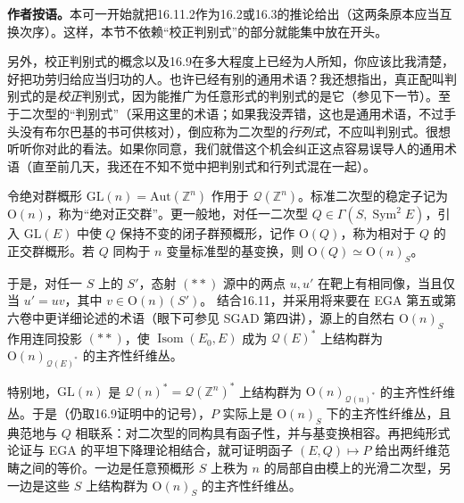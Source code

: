 \begingroup
\def\newscope{V-Q}
\def\OO{\mathcal O}
\def\Qsp{\mathcal Q}
\def\Sym{\operatorname{Sym}}
\def\Isom{\operatorname{Isom}}
\def\Spec{\operatorname{Spec}}
\noindent\textbf{作者按语。}\quad 本可一开始就把16.11.2作为16.2或16.3的推论给出（这两条原本应当互换次序）。这样，本节不依赖“校正判别式”的部分就能集中放在开头。

另外，校正判别式的概念以及16.9在多大程度上已经为人所知，你应该比我清楚，好把功劳归给应当归功的人。也许已经有别的通用术语？我还想指出，真正配叫判别式的是\emph{校正}判别式，因为能推广为任意形式的判别式的是它（参见下一节）。至于二次型的“判别式”（采用这里的术语；如果我没弄错，这也是通用术语，不过手头没有布尔巴基的书可供核对），倒应称为二次型的\emph{行列式}，不应叫判别式。很想听听你对此的看法。如果你同意，我们就借这个机会纠正这点容易误导人的通用术语（直至前几天，我还在不知不觉中把判别式和行列式混在一起）。

令绝对群概形 $\mathrm{GL}(n)=\mathrm{Aut}(\mathbb Z^n)$ 作用于 $\Qsp(\mathbb Z^n)$。标准二次型的稳定子记为 $\mathrm O(n)$，称为“绝对正交群”。更一般地，对任一二次型 $Q\in\Gamma(S,\Sym^2E)$，引入 $\mathrm{GL}(E)$ 中使 $Q$ 保持不变的闭子群预概形，记作 $\mathrm O(Q)$，称为相对于 $Q$ 的正交群概形。若 $Q$ 同构于 $n$ 变量标准型的基变换，则 $\mathrm O(Q)\simeq\mathrm O(n)_S$。

于是，对任一 $S$ 上的 $S'$，态射 $(**)$ 源中的两点 $u,u'$ 在靶上有相同像，当且仅当 $u'=uv$，其中 $v\in\mathrm O(n)(S')$。
结合16.11，并采用将来要在 EGA 第五或第六卷中更详细论述的术语（眼下可参见 SGAD 第四讲），源上的自然右 $\mathrm O(n)_S$ 作用连同投影 $(**)$，使 $\Isom(E_0,E)$ 成为 $\Qsp(E)^*$ 上结构群为 $\mathrm O(n)_{\Qsp(E)^*}$ 的主齐性纤维丛。

特别地，$\mathrm{GL}(n)$ 是 $\Qsp(n)^*=\Qsp(\mathbb Z^n)^*$ 上结构群为 $\mathrm O(n)_{\Qsp(n)^*}$ 的主齐性纤维丛。于是（仍取16.9证明中的记号），$P$ 实际上是 $\mathrm O(n)_S$ 下的主齐性纤维丛，且典范地与 $Q$ 相联系：对二次型的同构具有函子性，并与基变换相容。再把纯形式论证与 EGA 的平坦下降理论相结合，就可证明函子 $(E,Q)\mapsto P$ 给出两纤维范畴之间的等价。一边是任意预概形 $S$ 上秩为 $n$ 的局部自由模上的光滑二次型，另一边是这些 $S$ 上结构群为 $\mathrm O(n)_S$ 的主齐性纤维丛。

